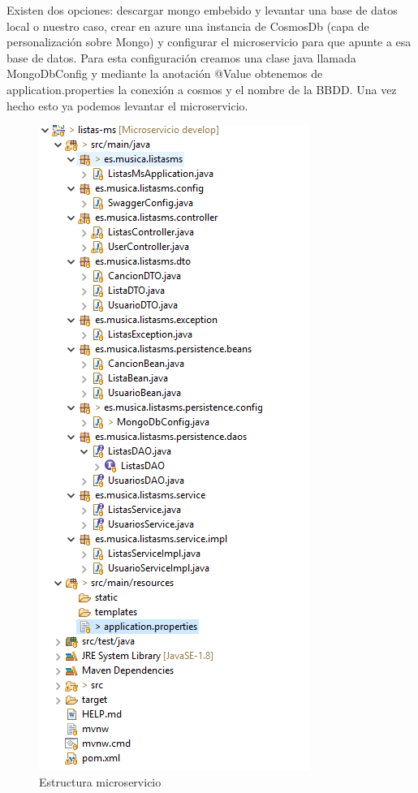 \documentclass[12pt]{report} %
\begin{document}
 Existen dos opciones: descargar mongo embebido y levantar una base de datos local o nuestro caso, crear en azure una instancia de CosmosDb (capa de personalización sobre Mongo) y configurar el microservicio para que apunte a esa base de datos. Para esta configuración creamos una clase java llamada MongoDbConfig y mediante la anotación @Value obtenemos de application.properties la conexión a cosmos y el nombre de la BBDD. Una vez hecho esto ya podemos levantar el microservicio.


\begin{figure}
	\centering
	\includegraphics[width=0.7\linewidth]{imagenes/estructuramicroservicio}
	\caption{Estructura microservicio}
	\label{fig:estructura-microservicio}
\end{figure}
\end{document}
